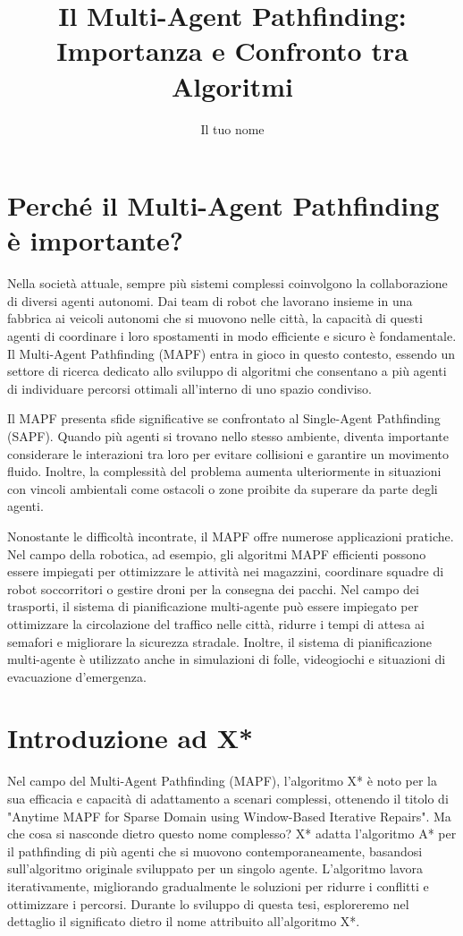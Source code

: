 \documentclass{article}
\title{Il Multi-Agent Pathfinding: Importanza e Confronto tra Algoritmi}
\author{Il tuo nome}
\date{}
\begin{document}
\maketitle

\section*{Perché il Multi-Agent Pathfinding è importante?}

Nella società attuale, sempre più sistemi complessi coinvolgono la collaborazione di diversi agenti autonomi. Dai team di robot che lavorano insieme in una fabbrica ai veicoli autonomi che si muovono nelle città, la capacità di questi agenti di coordinare i loro spostamenti in modo efficiente e sicuro è fondamentale. Il Multi-Agent Pathfinding (MAPF) entra in gioco in questo contesto, essendo un settore di ricerca dedicato allo sviluppo di algoritmi che consentano a più agenti di individuare percorsi ottimali all'interno di uno spazio condiviso.

Il MAPF presenta sfide significative se confrontato al Single-Agent Pathfinding (SAPF). Quando più agenti si trovano nello stesso ambiente, diventa importante considerare le interazioni tra loro per evitare collisioni e garantire un movimento fluido. Inoltre, la complessità del problema aumenta ulteriormente in situazioni con vincoli ambientali come ostacoli o zone proibite da superare da parte degli agenti.

Nonostante le difficoltà incontrate, il MAPF offre numerose applicazioni pratiche. Nel campo della robotica, ad esempio, gli algoritmi MAPF efficienti possono essere impiegati per ottimizzare le attività nei magazzini, coordinare squadre di robot soccorritori o gestire droni per la consegna dei pacchi.
Nel campo dei trasporti, il sistema di pianificazione multi-agente può essere impiegato per ottimizzare la circolazione del traffico nelle città, ridurre i tempi di attesa ai semafori e migliorare la sicurezza stradale. Inoltre, il sistema di pianificazione multi-agente è utilizzato anche in simulazioni di folle, videogiochi e situazioni di evacuazione d'emergenza.

\section*{Introduzione ad X*}

Nel campo del Multi-Agent Pathfinding (MAPF), l'algoritmo X* è noto per la sua efficacia e capacità di adattamento a scenari complessi,
 ottenendo il titolo di "Anytime MAPF for Sparse Domain using Window-Based Iterative Repairs".
  Ma che cosa si nasconde dietro questo nome complesso? X* adatta l'algoritmo A* per il pathfinding di
   più agenti che si muovono contemporaneamente, basandosi sull'algoritmo originale sviluppato per un
    singolo agente. L'algoritmo lavora iterativamente, migliorando gradualmente le soluzioni per ridurre i
     conflitti e ottimizzare i percorsi. Durante lo sviluppo di questa tesi, esploreremo nel dettaglio il significato dietro il nome attribuito all'algoritmo X*. 
\end{document}
